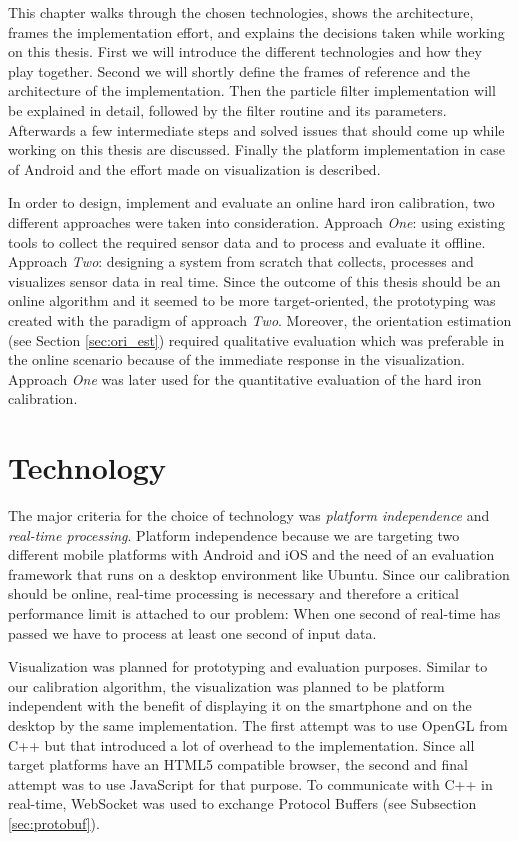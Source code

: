 This chapter walks through the chosen technologies, shows the architecture, frames the implementation effort, and explains the decisions taken while working on this thesis. First we will introduce the different technologies and how they play together. Second we will shortly define the frames of reference and the architecture of the implementation. Then the particle filter implementation will be explained in detail, followed by the filter routine and its parameters. Afterwards a few intermediate steps and solved issues that should come up while working on this thesis are discussed. Finally the platform implementation in case of Android and the effort made on visualization is described.

In order to design, implement and evaluate an online hard iron calibration, two different approaches were taken into consideration. Approach \textit{One}: using existing tools to collect the required sensor data and to process and evaluate it offline. Approach \textit{Two}: designing a system from scratch that collects, processes and visualizes sensor data in real time. Since the outcome of this thesis should be an online algorithm and it seemed to be more target-oriented, the prototyping was created with the paradigm of approach \textit{Two}. Moreover, the orientation estimation (see Section \ref{sec:ori_est}) required qualitative evaluation which was preferable in the online scenario because of the immediate response in the visualization. Approach \textit{One} was later used for the quantitative evaluation of the hard iron calibration.

\section{Technology}

The major criteria for the choice of technology was \textit{platform independence} and \textit{real-time processing}. Platform independence because we are targeting two different mobile platforms with Android and iOS and the need of an evaluation framework that runs on a desktop environment like Ubuntu. Since our calibration should be online, real-time processing is necessary and therefore a critical performance limit is attached to our problem: When one second of real-time has passed we have to process at least one second of input data.

Visualization was planned for prototyping and evaluation purposes. Similar to our calibration algorithm, the visualization was planned to be platform independent with the benefit of displaying it on the smartphone and on the desktop by the same implementation. The first attempt was to use OpenGL from C++ but that introduced a lot of overhead to the implementation. Since all target platforms have an HTML5 compatible browser, the second and final attempt was to use JavaScript for that purpose. To communicate with C++ in real-time, WebSocket was used to exchange Protocol Buffers (see Subsection \ref{sec:protobuf}).

